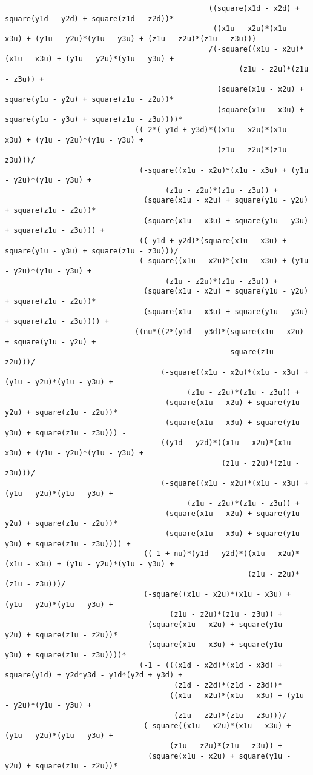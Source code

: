 \begin{lstlisting}
											   ((square(x1d - x2d) + square(y1d - y2d) + square(z1d - z2d))*
												((x1u - x2u)*(x1u - x3u) + (y1u - y2u)*(y1u - y3u) + (z1u - z2u)*(z1u - z3u)))
											   /(-square((x1u - x2u)*(x1u - x3u) + (y1u - y2u)*(y1u - y3u) + 
													  (z1u - z2u)*(z1u - z3u)) + 
												 (square(x1u - x2u) + square(y1u - y2u) + square(z1u - z2u))*
												 (square(x1u - x3u) + square(y1u - y3u) + square(z1u - z3u))))*
							  ((-2*(-y1d + y3d)*((x1u - x2u)*(x1u - x3u) + (y1u - y2u)*(y1u - y3u) + 
												 (z1u - z2u)*(z1u - z3u)))/
							   (-square((x1u - x2u)*(x1u - x3u) + (y1u - y2u)*(y1u - y3u) + 
									 (z1u - z2u)*(z1u - z3u)) + 
								(square(x1u - x2u) + square(y1u - y2u) + square(z1u - z2u))*
								(square(x1u - x3u) + square(y1u - y3u) + square(z1u - z3u))) + 
							   ((-y1d + y2d)*(square(x1u - x3u) + square(y1u - y3u) + square(z1u - z3u)))/
							   (-square((x1u - x2u)*(x1u - x3u) + (y1u - y2u)*(y1u - y3u) + 
									 (z1u - z2u)*(z1u - z3u)) + 
								(square(x1u - x2u) + square(y1u - y2u) + square(z1u - z2u))*
								(square(x1u - x3u) + square(y1u - y3u) + square(z1u - z3u)))) + 
							  ((nu*((2*(y1d - y3d)*(square(x1u - x2u) + square(y1u - y2u) + 
													square(z1u - z2u)))/
									(-square((x1u - x2u)*(x1u - x3u) + (y1u - y2u)*(y1u - y3u) + 
										  (z1u - z2u)*(z1u - z3u)) + 
									 (square(x1u - x2u) + square(y1u - y2u) + square(z1u - z2u))*
									 (square(x1u - x3u) + square(y1u - y3u) + square(z1u - z3u))) - 
									((y1d - y2d)*((x1u - x2u)*(x1u - x3u) + (y1u - y2u)*(y1u - y3u) + 
												  (z1u - z2u)*(z1u - z3u)))/
									(-square((x1u - x2u)*(x1u - x3u) + (y1u - y2u)*(y1u - y3u) + 
										  (z1u - z2u)*(z1u - z3u)) + 
									 (square(x1u - x2u) + square(y1u - y2u) + square(z1u - z2u))*
									 (square(x1u - x3u) + square(y1u - y3u) + square(z1u - z3u)))) + 
								((-1 + nu)*(y1d - y2d)*((x1u - x2u)*(x1u - x3u) + (y1u - y2u)*(y1u - y3u) + 
														(z1u - z2u)*(z1u - z3u)))/
								(-square((x1u - x2u)*(x1u - x3u) + (y1u - y2u)*(y1u - y3u) + 
									  (z1u - z2u)*(z1u - z3u)) + 
								 (square(x1u - x2u) + square(y1u - y2u) + square(z1u - z2u))*
								 (square(x1u - x3u) + square(y1u - y3u) + square(z1u - z3u))))*
							   (-1 - (((x1d - x2d)*(x1d - x3d) + square(y1d) + y2d*y3d - y1d*(y2d + y3d) + 
									   (z1d - z2d)*(z1d - z3d))*
									  ((x1u - x2u)*(x1u - x3u) + (y1u - y2u)*(y1u - y3u) + 
									   (z1u - z2u)*(z1u - z3u)))/
								(-square((x1u - x2u)*(x1u - x3u) + (y1u - y2u)*(y1u - y3u) + 
									  (z1u - z2u)*(z1u - z3u)) + 
								 (square(x1u - x2u) + square(y1u - y2u) + square(z1u - z2u))*

\end{lstlisting}
